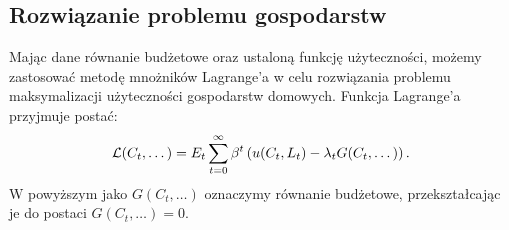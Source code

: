 \subsection{Rozwiązanie problemu gospodarstw}
\label{sec:solve_household}

Mając dane równanie budżetowe oraz ustaloną funkcję użyteczności, możemy zastosować metodę mnożników Lagrange'a w celu rozwiązania problemu maksymalizacji użyteczności gospodarstw domowych. Funkcja Lagrange'a przyjmuje postać:
\begin{equation}
    \mathcal{L}(C_t, \dots) = E_t \sum_{t=0}^{\infty} \beta^t \left(u(C_t, L_t) - \lambda_t G(C_t, \dots)\right).
\end{equation}
W powyższym jako $G(C_t, \dots)$ oznaczymy równanie budżetowe, przekształcając je do postaci $G(C_t, \dots) = 0$.

